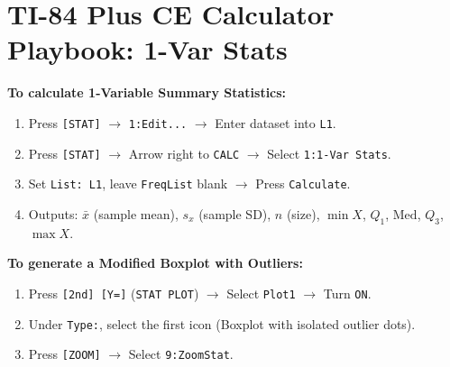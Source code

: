 ﻿\documentclass[11pt,oneside,openany]{book}
\begin{document}
\section{TI-84 Plus CE Calculator Playbook: 1-Var Stats}
\begin{calculatorbox}
\textbf{To calculate 1-Variable Summary Statistics:}
\begin{enumerate}[leftmargin=1.2em]
  \item Press \texttt{[STAT]} $\rightarrow$ \texttt{1:Edit...} $\rightarrow$ Enter dataset into \texttt{L1}.
  \item Press \texttt{[STAT]} $\rightarrow$ Arrow right to \texttt{CALC} $\rightarrow$ Select \texttt{1:1-Var Stats}.
  \item Set \texttt{List: L1}, leave \texttt{FreqList} blank $\rightarrow$ Press \texttt{Calculate}.
  \item Outputs: $\bar{x}$ (sample mean), $s_x$ (sample SD), $n$ (size), $\min X$, $Q_1$, $\text{Med}$, $Q_3$, $\max X$.
\end{enumerate}
\textbf{To generate a Modified Boxplot with Outliers:}
\begin{enumerate}[leftmargin=1.2em]
  \item Press \texttt{[2nd] [Y=]} (\texttt{STAT PLOT}) $\rightarrow$ Select \texttt{Plot1} $\rightarrow$ Turn \texttt{ON}.
  \item Under \texttt{Type:}, select the first icon (Boxplot with isolated outlier dots).
  \item Press \texttt{[ZOOM]} $\rightarrow$ Select \texttt{9:ZoomStat}.
\end{enumerate}
\end{calculatorbox}
\end{document}
